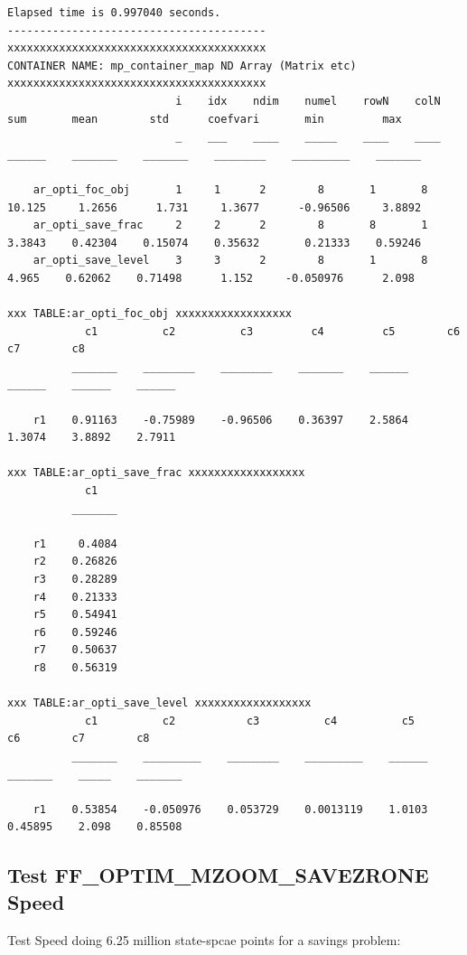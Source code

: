 \documentclass[
]{book}
\begin{document}
\begin{verbatim}
Elapsed time is 0.997040 seconds.
----------------------------------------
xxxxxxxxxxxxxxxxxxxxxxxxxxxxxxxxxxxxxxxx
CONTAINER NAME: mp_container_map ND Array (Matrix etc)
xxxxxxxxxxxxxxxxxxxxxxxxxxxxxxxxxxxxxxxx
                          i    idx    ndim    numel    rowN    colN     sum       mean        std      coefvari       min         max  
                          _    ___    ____    _____    ____    ____    ______    _______    _______    ________    _________    _______

    ar_opti_foc_obj       1     1      2        8       1       8      10.125     1.2656      1.731     1.3677      -0.96506     3.8892
    ar_opti_save_frac     2     2      2        8       8       1      3.3843    0.42304    0.15074    0.35632       0.21333    0.59246
    ar_opti_save_level    3     3      2        8       1       8       4.965    0.62062    0.71498      1.152     -0.050976      2.098

xxx TABLE:ar_opti_foc_obj xxxxxxxxxxxxxxxxxx
            c1          c2          c3         c4         c5        c6        c7        c8  
          _______    ________    ________    _______    ______    ______    ______    ______

    r1    0.91163    -0.75989    -0.96506    0.36397    2.5864    1.3074    3.8892    2.7911

xxx TABLE:ar_opti_save_frac xxxxxxxxxxxxxxxxxx
            c1   
          _______

    r1     0.4084
    r2    0.26826
    r3    0.28289
    r4    0.21333
    r5    0.54941
    r6    0.59246
    r7    0.50637
    r8    0.56319

xxx TABLE:ar_opti_save_level xxxxxxxxxxxxxxxxxx
            c1          c2           c3          c4          c5        c6        c7        c8   
          _______    _________    ________    _________    ______    _______    _____    _______

    r1    0.53854    -0.050976    0.053729    0.0013119    1.0103    0.45895    2.098    0.85508
\end{verbatim}

\hypertarget{test-ff_optim_mzoom_savezrone-speed}{%
\subsection{Test FF\_OPTIM\_MZOOM\_SAVEZRONE Speed}\label{test-ff_optim_mzoom_savezrone-speed}}

Test Speed doing 6.25 million state-spcae points for a savings problem:
\end{document}
